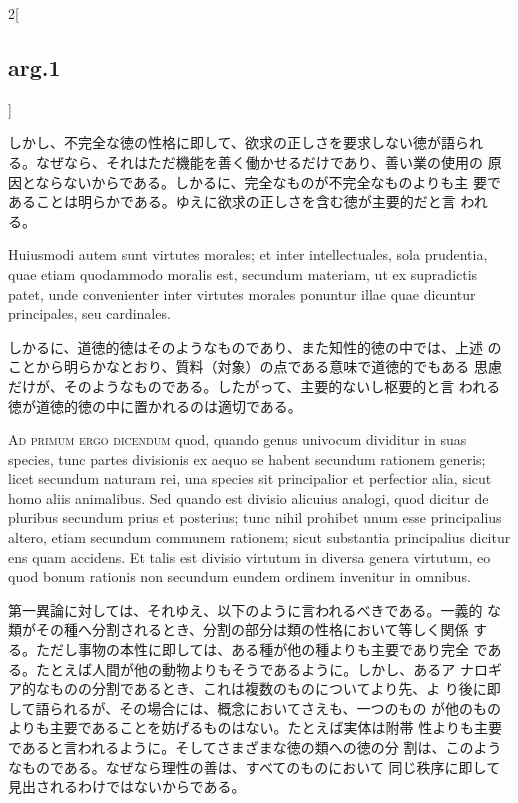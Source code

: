 \documentclass[paper=a4paper,fontsize=10pt,jafontsize=9pt,titlepage]{jlreq}
\begin{document}
\begin{paracol}{2}[\subsection{arg.1}]
\switchcolumn

しかし、不完全な徳の性格に即して、欲求の正しさを要求しない徳が語られ
 る。なぜなら、それはただ機能を善く働かせるだけであり、善い業の使用の
 原因とならないからである。しかるに、完全なものが不完全なものよりも主
 要であることは明らかである。ゆえに欲求の正しさを含む徳が主要的だと言
 われる。

\switchcolumn*

Huiusmodi
 autem sunt virtutes morales; et inter intellectuales, sola prudentia,
 quae etiam quodammodo moralis est, secundum materiam, ut ex
 supradictis patet, unde convenienter inter virtutes morales ponuntur
 illae quae dicuntur principales, seu cardinales.

\switchcolumn

しかるに、道徳的徳はそのようなものであり、また知性的徳の中では、上述
 のことから明らかなとおり、質料（対象）の点である意味で道徳的でもある
 思慮だけが、そのようなものである。したがって、主要的ないし枢要的と言
 われる徳が道徳的徳の中に置かれるのは適切である。

\switchcolumn*[\subsection{ad.1}]

{\scshape Ad primum ergo dicendum} quod, quando genus univocum
dividitur in suas species, tunc partes divisionis ex aequo se habent
secundum rationem generis; licet secundum naturam rei, una species sit
principalior et perfectior alia, sicut homo aliis animalibus. Sed
quando est divisio alicuius analogi, quod dicitur de pluribus secundum
prius et posterius; tunc nihil prohibet unum esse principalius altero,
etiam secundum communem rationem; sicut substantia principalius
dicitur ens quam accidens. Et talis est divisio virtutum in diversa
genera virtutum, eo quod bonum rationis non secundum eundem ordinem
invenitur in omnibus.

\switchcolumn

第一異論に対しては、それゆえ、以下のように言われるべきである。一義的
 な類がその種へ分割されるとき、分割の部分は類の性格において等しく関係
 する。ただし事物の本性に即しては、ある種が他の種よりも主要であり完全
 である。たとえば人間が他の動物よりもそうであるように。しかし、あるア
 ナロギア的なものの分割であるとき、これは複数のものについてより先、よ
 り後に即して語られるが、その場合には、概念においてさえも、一つのもの
 が他のものよりも主要であることを妨げるものはない。たとえば実体は附帯
 性よりも主要であると言われるように。そしてさまざまな徳の類への徳の分
 割は、このようなものである。なぜなら理性の善は、すべてのものにおいて
 同じ秩序に即して見出されるわけではないからである。


\end{paracol}
\end{document}
